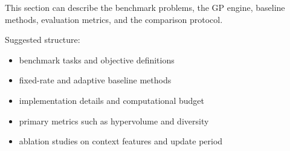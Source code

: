 This section can describe the benchmark problems, the GP engine, baseline
methods, evaluation metrics, and the comparison protocol.

Suggested structure:
%
\begin{itemize}
  \item benchmark tasks and objective definitions
  \item fixed-rate and adaptive baseline methods
  \item implementation details and computational budget
  \item primary metrics such as hypervolume and diversity
  \item ablation studies on context features and update period
\end{itemize}
